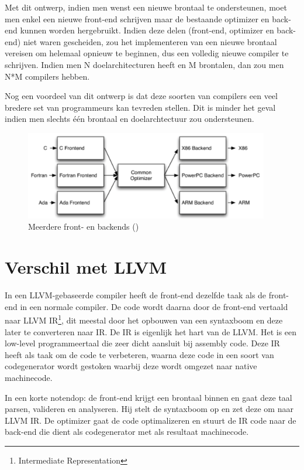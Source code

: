 Met dit ontwerp, indien men wenst een nieuwe brontaal te ondersteunen, moet men enkel een nieuwe front-end schrijven maar de bestaande optimizer en back-end kunnen worden hergebruikt. Indien deze delen (front-end, optimizer en back-end) niet waren gescheiden, zou het implementeren van een nieuwe brontaal vereisen om helemaal opnieuw te beginnen, dus een volledig nieuwe compiler te schrijven. Indien men N doelarchitecturen heeft en M brontalen, dan zou men N*M compilers hebben.

Nog een voordeel van dit ontwerp is dat deze soorten van compilers een veel bredere set van programmeurs kan tevreden stellen. Dit is minder het geval indien men slechts één brontaal en doelarchtectuur zou ondersteunen. 

\begin{figure} [ht]
	\centering
	\includegraphics[width=0.95\textwidth]{img/llvmdriefasen}
	\caption{Meerdere front- en backends (\cite{aosa})}
	\label{fig:llvmdriefasen}
\end{figure}

\section{Verschil met LLVM}
In een LLVM-gebaseerde compiler heeft de front-end dezelfde taak als de front-end in een normale compiler. De code wordt daarna door de front-end vertaald naar LLVM IR\footnote{Intermediate Representation}, dit meestal door het opbouwen van een syntaxboom en deze later te converteren naar IR. De IR is eigenlijk het hart van de LLVM. Het is een low-level programmeertaal die zeer dicht aansluit bij assembly code. Deze IR heeft als taak om de code te verbeteren, waarna deze code in een soort van codegenerator wordt gestoken waarbij deze wordt omgezet naar native machinecode. 

In een korte notendop: de front-end krijgt een brontaal binnen en gaat deze taal parsen, valideren en analyseren. Hij stelt de syntaxboom op en zet deze om naar LLVM IR. De optimizer gaat de code optimalizeren en stuurt de IR code naar de back-end die dient als codegenerator met als resultaat machinecode.

